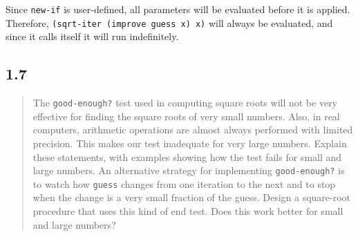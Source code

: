 \documentclass[a4paper, titlepage, twoside]{article}
\begin{document}
Since \texttt{new-if} is user-defined, all parameters will be evaluated before it is applied. Therefore, \texttt{(sqrt-iter (improve guess x) x)} will always be evaluated, and since it calls itself it will run indefinitely.

\subsection*{1.7}
\label{sec:orgfa452e7}

\begin{quote}
The \texttt{good-enough?} test used in computing square roots will not be very effective for finding the square roots of very small numbers.  Also, in real computers, arithmetic operations are almost always performed with limited precision.  This makes our test inadequate for very large numbers.  Explain these statements, with examples showing how the test fails for small and large numbers.  An alternative strategy for implementing \texttt{good-enough?} is to watch how \texttt{guess} changes from one iteration to the next and to stop when the change is a very small fraction of the guess.  Design a square-root procedure that uses this kind of end test. Does this work better for small and large numbers?
\end{quote}
\end{document}
